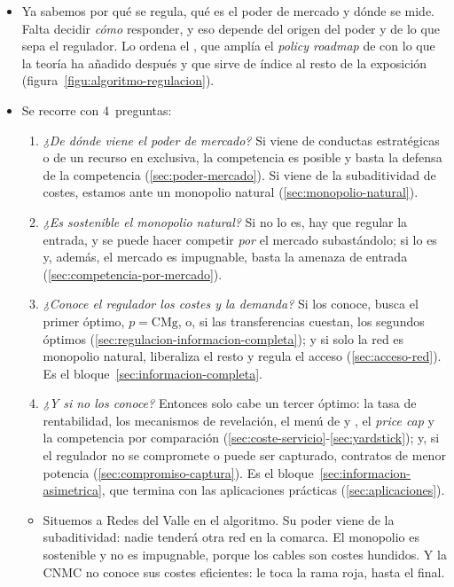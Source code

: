 \documentclass[11pt]{article}
\begin{document}
\begin{itemize}
\item Ya sabemos por qué se regula, qué es el poder de mercado y dónde se mide. Falta decidir \emph{cómo} responder, y eso depende del origen del poder y de lo que sepa el regulador. Lo ordena el , que amplía el \emph{policy roadmap} de \textcite{Braeutigam1989Optimal} con lo que la teoría ha añadido después y que sirve de índice al resto de la exposición (figura~\ref{figu:algoritmo-regulacion}).
\item Se recorre con 4~preguntas:
  \begin{enumerate}
  \item \emph{¿De dónde viene el poder de mercado?} Si viene de conductas estratégicas o de un recurso en exclusiva, la competencia es posible y basta la defensa de la competencia (\ref{sec:poder-mercado}). Si viene de la subaditividad de costes, estamos ante un monopolio natural (\ref{sec:monopolio-natural}).
  \item \emph{¿Es sostenible el monopolio natural?} Si no lo es, hay que regular la entrada, y se puede hacer competir \emph{por} el mercado subastándolo; si lo es y, además, el mercado es impugnable, basta la amenaza de entrada (\ref{sec:competencia-por-mercado}).
  \item \emph{¿Conoce el regulador los costes y la demanda?} Si los conoce, busca el primer óptimo, $p=\mathrm{CMg}$, o, si las transferencias cuestan, los segundos óptimos (\ref{sec:regulacion-informacion-completa}); y si solo la red es monopolio natural, liberaliza el resto y regula el acceso (\ref{sec:acceso-red}). Es el bloque~\ref{sec:informacion-completa}.
  \item \emph{¿Y si no los conoce?} Entonces solo cabe un tercer óptimo: la tasa de rentabilidad, los mecanismos de revelación, el menú de  y , el \emph{price cap} y la competencia por comparación (\ref{sec:coste-servicio}-\ref{sec:yardstick}); y, si el regulador no se compromete o puede ser capturado, contratos de menor potencia (\ref{sec:compromiso-captura}). Es el bloque~\ref{sec:informacion-asimetrica}, que termina con las aplicaciones prácticas (\ref{sec:aplicaciones}).
  \end{enumerate}
  \begin{itemize}
  \item Situemos a Redes del Valle en el algoritmo. Su poder viene de la subaditividad: nadie tenderá otra red en la comarca. El monopolio es sostenible y no es impugnable, porque los cables son costes hundidos. Y la CNMC no conoce sus costes eficientes: le toca la rama roja, hasta el final.
  \end{itemize}
\end{itemize}
\end{document}
